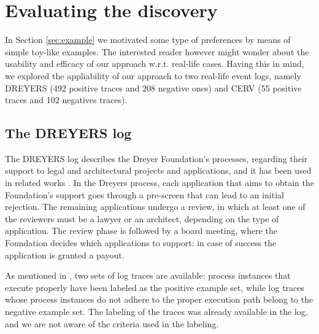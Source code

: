 









\section{Evaluating the discovery}
\label{sec:evaluation}


In Section \ref{sec:example} we motivated some type of preferences by means of simple toy-like examples. The interested reader however might wonder about the usability and efficacy of our approach w.r.t. real-life cases. Having this in mind, we explored the appliability of our approach to two real-life event logs, namely DREYERS (492 positive traces and 208 negative ones) and CERV (55 positive traces and 102 negatives traces).



\subsection{The DREYERS log}
\label{subsec:dreyers}

The DREYERS log describes the Dreyer Foundation’s processes, regarding their support to legal and architectural projects and applications, and it has been used in related works \cite{DBLP:conf/ssci/DeboisS15,DBLP:conf/bpm/SlaatsDB21}. In the Dreyers process, each application that aims to obtain the Foundation's support goes through a pre-screen that can lead to an initial rejection. The remaining applications undergo a review, in which at least one of the reviewers must be a lawyer or an architect, depending on the type of application. The review phase is followed by a board meeting, where the Foundation decides which applications to support: in case of success the application is granted a payout.

As mentioned in \cite{DBLP:conf/bpm/SlaatsDB21}, two sets of log traces are available: process instances that execute properly have been labeled as the positive example set, while log traces whose process instances do not adhere to the proper execution path belong to the negative example set. The labeling of the traces was already available in the log, and we are not aware of the criteria used in the labeling.

